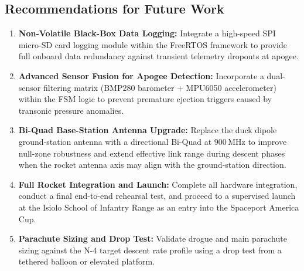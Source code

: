 \subsection{Recommendations for Future Work}

\begin{enumerate}
  \item \textbf{Non-Volatile Black-Box Data Logging:} Integrate a high-speed SPI
    micro-SD card logging module within the FreeRTOS framework to provide full
    onboard data redundancy against transient telemetry dropouts at apogee.

  \item \textbf{Advanced Sensor Fusion for Apogee Detection:} Incorporate a
    dual-sensor filtering matrix (BMP280 barometer + MPU6050 accelerometer)
    within the FSM logic to prevent premature ejection triggers caused by
    transonic pressure anomalies.

  \item \textbf{Bi-Quad Base-Station Antenna Upgrade:} Replace the duck dipole
    ground-station antenna with a directional Bi-Quad at 900\,MHz to improve
    null-zone robustness and extend effective link range during descent phases
    when the rocket antenna axis may align with the ground-station direction.

  \item \textbf{Full Rocket Integration and Launch:} Complete all hardware
    integration, conduct a final end-to-end rehearsal test, and proceed to a
    supervised launch at the Isiolo School of Infantry Range as an entry into the
    Spaceport America Cup.

  \item \textbf{Parachute Sizing and Drop Test:} Validate drogue and main
    parachute sizing against the N-4 target descent rate profile using a drop
    test from a tethered balloon or elevated platform.
\end{enumerate}
